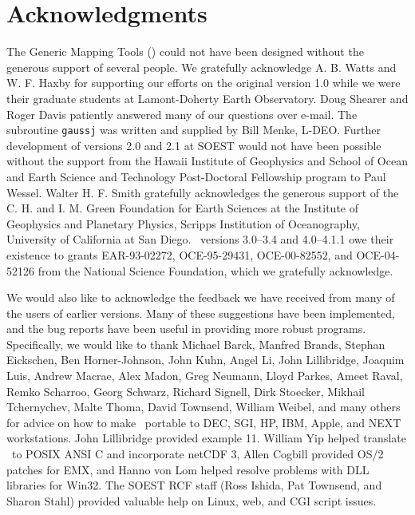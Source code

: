 %
%


\chapter*{Acknowledgments}

The Generic Mapping Tools (\GMT) could not have been designed without
the generous support of several people.  We gratefully acknowledge
A. B. Watts and W. F. Haxby for supporting our efforts on the original
version 1.0 while we were their graduate students at Lamont-Doherty
Earth Observatory.  Doug Shearer and Roger Davis patiently answered
many of our questions over e-mail.  The subroutine \texttt{gaussj} was
written and supplied by Bill Menke, L-DEO.
Further development of versions 2.0 and 2.1 at SOEST would not have
been possible without the support from the Hawaii Institute of
Geophysics and School of Ocean and Earth Science and Technology
Post-Doctoral Fellowship program to Paul Wessel.  Walter H. F. Smith
gratefully acknowledges the generous support of the C. H. and I. M.
Green Foundation for Earth Sciences at the Institute of Geophysics
and Planetary Physics, Scripps Institution of Oceanography, University
of California at San Diego.
\GMT\ versions 3.0--3.4 and 4.0--4.1.1 owe their existence to grants
EAR-93-02272, OCE-95-29431, OCE-00-82552, and OCE-04-52126
from the National Science Foundation, which we gratefully acknowledge.

We would also like to acknowledge the feedback we have received from many
of the users of earlier versions.  Many of these suggestions have
been implemented, and the bug reports have been useful in providing
more robust programs.  Specifically, we would like to thank
Michael Barck,
Manfred Brands,
Stephan Eickschen,
Ben Horner-Johnson,
John Kuhn,
Angel Li,
John Lillibridge,
Joaquim Luis,
Andrew Macrae,
Alex Madon,
Greg Neumann,
Lloyd Parkes,
Ameet Raval,
Remko Scharroo,
Georg Schwarz,
Richard Signell,
Dirk Stoecker,
Mikhail Tchernychev,
Malte Thoma,
David Townsend,
William Weibel,
and many others for
advice on how to make \GMT\ portable to DEC, SGI, HP, IBM, Apple, and
NEXT workstations.  John Lillibridge provided example 11.  William
Yip helped translate \GMT\ to POSIX ANSI C and incorporate netCDF 3, 
Allen Cogbill provided OS/2 patches for EMX, and Hanno von Lom helped
resolve problems with DLL libraries for Win32.  The SOEST RCF staff
(Ross Ishida, Pat Townsend, and Sharon Stahl) provided valuable help
on Linux, web, and CGI script issues.

